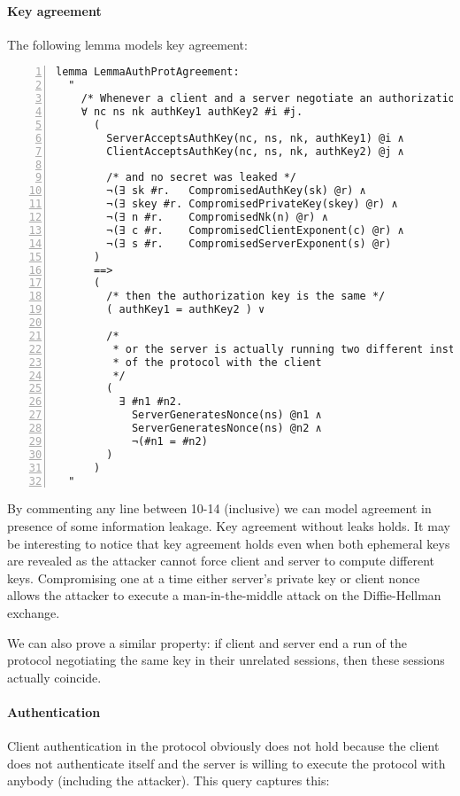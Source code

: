 \paragraph{Key agreement}
The following lemma models key agreement:
\begin{lstlisting}[numbers=left]
lemma LemmaAuthProtAgreement:
  "
    /* Whenever a client and a server negotiate an authorization key */
    ∀ nc ns nk authKey1 authKey2 #i #j.
      (
        ServerAcceptsAuthKey(nc, ns, nk, authKey1) @i ∧
        ClientAcceptsAuthKey(nc, ns, nk, authKey2) @j ∧

        /* and no secret was leaked */
        ¬(∃ sk #r.   CompromisedAuthKey(sk) @r) ∧
        ¬(∃ skey #r. CompromisedPrivateKey(skey) @r) ∧
        ¬(∃ n #r.    CompromisedNk(n) @r) ∧
        ¬(∃ c #r.    CompromisedClientExponent(c) @r) ∧
        ¬(∃ s #r.    CompromisedServerExponent(s) @r)
      )
      ==>
      (
        /* then the authorization key is the same */
        ( authKey1 = authKey2 ) ∨
        
        /* 
         * or the server is actually running two different instances
         * of the protocol with the client
         */
        (
          ∃ #n1 #n2.
            ServerGeneratesNonce(ns) @n1 ∧
            ServerGeneratesNonce(ns) @n2 ∧
            ¬(#n1 = #n2)
        )
      )
  "
\end{lstlisting}

By commenting any line between 10-14 (inclusive) we can model agreement in presence of some information leakage.
Key agreement without leaks holds. It may be interesting to notice that key agreement holds even when both ephemeral keys are revealed as the attacker cannot force client and server to compute different keys. Compromising one at a time either server's private key or client nonce allows the attacker to execute a man-in-the-middle attack on the Diffie-Hellman exchange.

We can also prove a similar property: if client and server end a run of the protocol negotiating the same key in their unrelated sessions, then these sessions actually coincide.

\paragraph{Authentication}
Client authentication in the protocol obviously does not hold because the client does not authenticate itself and the server is willing to execute the protocol with anybody (including the attacker). This query captures this:

